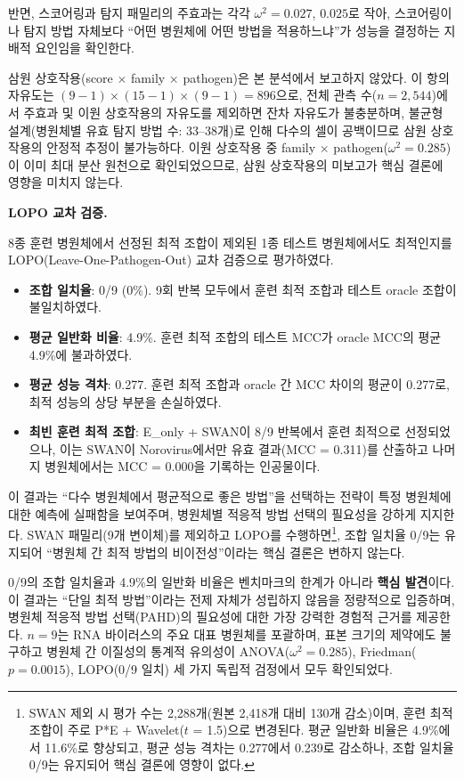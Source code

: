 반면, 스코어링과 탐지 패밀리의 주효과는 각각 $\omega^2 = 0.027$, $0.025$로 작아, 스코어링이나 탐지 방법 자체보다 ``어떤 병원체에 어떤 방법을 적용하느냐''가 성능을 결정하는 지배적 요인임을 확인한다.

삼원 상호작용(score $\times$ family $\times$ pathogen)은 본 분석에서 보고하지 않았다.
이 항의 자유도는 $(9-1) \times (15-1) \times (9-1) = 896$으로, 전체 관측 수($n = 2{,}544$)에서 주효과 및 이원 상호작용의 자유도를 제외하면 잔차 자유도가 불충분하며, 불균형 설계(병원체별 유효 탐지 방법 수: 33--38개)로 인해 다수의 셀이 공백이므로 삼원 상호작용의 안정적 추정이 불가능하다.
이원 상호작용 중 family $\times$ pathogen($\omega^2 = 0.285$)이 이미 최대 분산 원천으로 확인되었으므로, 삼원 상호작용의 미보고가 핵심 결론에 영향을 미치지 않는다.


\textbf{LOPO 교차 검증.}
\label{subsec:9pathogen_lopo}

8종 훈련 병원체에서 선정된 최적 조합이 제외된 1종 테스트 병원체에서도 최적인지를 LOPO(Leave-One-Pathogen-Out) 교차 검증으로 평가하였다.

\begin{itemize}
\item \textbf{조합 일치율}: 0/9 (0\%). 9회 반복 모두에서 훈련 최적 조합과 테스트 oracle 조합이 불일치하였다.
\item \textbf{평균 일반화 비율}: 4.9\%. 훈련 최적 조합의 테스트 MCC가 oracle MCC의 평균 4.9\%에 불과하였다.
\item \textbf{평균 성능 격차}: 0.277. 훈련 최적 조합과 oracle 간 MCC 차이의 평균이 0.277로, 최적 성능의 상당 부분을 손실하였다.
\item \textbf{최빈 훈련 최적 조합}: E\_only + SWAN이 8/9 반복에서 훈련 최적으로 선정되었으나, 이는 SWAN이 Norovirus에서만 유효 결과(MCC = 0.311)를 산출하고 나머지 병원체에서는 MCC = 0.000을 기록하는 인공물이다.
\end{itemize}

이 결과는 ``다수 병원체에서 평균적으로 좋은 방법''을 선택하는 전략이 특정 병원체에 대한 예측에 실패함을 보여주며, 병원체별 적응적 방법 선택의 필요성을 강하게 지지한다.
SWAN 패밀리(9개 변이체)를 제외하고 LOPO를 수행하면\footnote{SWAN 제외 시 평가 수는 2,288개(원본 2,418개 대비 130개 감소)이며, 훈련 최적 조합이 주로 P*E + Wavelet($t$ = 1.5)으로 변경된다. 평균 일반화 비율은 4.9\%에서 11.6\%로 향상되고, 평균 성능 격차는 0.277에서 0.239로 감소하나, 조합 일치율 0/9는 유지되어 핵심 결론에 영향이 없다.}, 조합 일치율 0/9는 유지되어 ``병원체 간 최적 방법의 비이전성''이라는 핵심 결론은 변하지 않는다.

0/9의 조합 일치율과 4.9\%의 일반화 비율은 벤치마크의 한계가 아니라 \textbf{핵심 발견}이다. 이 결과는 ``단일 최적 방법''이라는 전제 자체가 성립하지 않음을 정량적으로 입증하며, 병원체 적응적 방법 선택(PAHD)의 필요성에 대한 가장 강력한 경험적 근거를 제공한다. $n=9$는 RNA 바이러스의 주요 대표 병원체를 포괄하며, 표본 크기의 제약에도 불구하고 병원체 간 이질성의 통계적 유의성이 ANOVA($\omega^2 = 0.285$), Friedman($p = 0.0015$), LOPO(0/9 일치) 세 가지 독립적 검정에서 모두 확인되었다.


